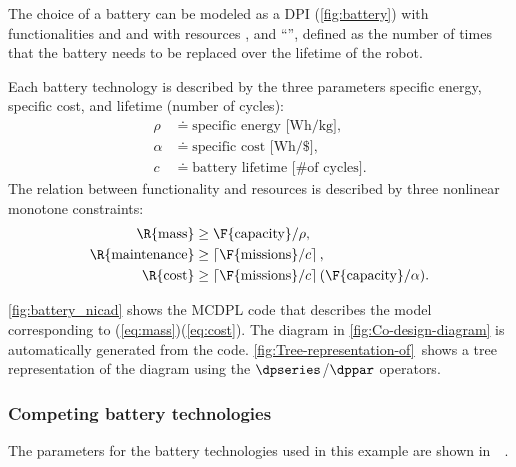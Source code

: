 The choice of a battery can be modeled as a DPI (\cref{fig:battery})
with functionalities  and 
and with resources ,  and ``'',
defined as the number of times that the battery needs to be replaced
over the lifetime of the robot.

Each battery technology is described by the three parameters specific
energy, specific cost, and lifetime (number of cycles):
\begin{align*}
\rho & \doteq\text{specific energy [Wh/kg]},\\
\alpha & \doteq\text{specific cost [Wh/\$]},\\
c & \doteq\text{battery lifetime [\# of cycles]}.
\end{align*}
The relation between functionality and resources is described by three
nonlinear monotone constraints:
\begin{align}
\R{\text{mass}} & \geq\F{\text{capacity}}/\rho,\label{eq:mass}\\
\R{\text{maintenance}} & \geq\left\lceil \F{\text{missions}}/c\right\rceil ,\label{eq:maintenance}\\
\R{\text{cost}} & \geq\left\lceil \F{\text{missions}}/c\right\rceil (\F{\text{capacity}}/\alpha).\label{eq:cost}
\end{align}

\cref{fig:battery_nicad} shows the MCDPL code that describes the
model corresponding to (\ref{eq:mass})\textendash (\ref{eq:cost}).
The diagram in \cref{fig:Co-design-diagram} is automatically generated
from the code. \cref{fig:Tree-representation-of}~shows a tree representation
of the diagram using the $\dpseries$/$\dppar$ operators.

\subsubsection{Competing battery technologies}

The parameters for the battery technologies used in this example are
shown in~~.


